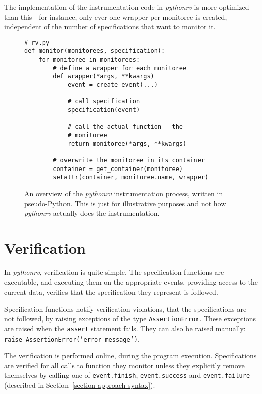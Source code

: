 \documentclass[a4paper,11pt]{kth-mag}
\begin{document}
The implementation of the instrumentation code in \textit{pythonrv} is more
optimized than this - for instance, only ever one wrapper per monitoree is
created, independent of the number of specifications that want to monitor it.

\begin{figure}[h!]
	\begin{center}
	\begin{minipage}{0.7\textwidth}
	\begin{lstlisting}
# rv.py
def monitor(monitorees, specification):
	for monitoree in monitorees:
		# define a wrapper for each monitoree
		def wrapper(*args, **kwargs)
			event = create_event(...)

			# call specification
			specification(event)

			# call the actual function - the
			# monitoree
			return monitoree(*args, **kwargs)

		# overwrite the monitoree in its container
		container = get_container(monitoree)
		setattr(container, monitoree.name, wrapper)
	\end{lstlisting}
	\end{minipage}
	\end{center}

	\caption{An overview of the \textit{pythonrv} instrumentation process,
		written in pseudo-Python. This is just for illustrative purposes and not
		how \textit{pythonrv} actually does the instrumentation.}
	\label{figure-instrumentation-overview}
\end{figure}



\section{Verification} \label{section-approach-verification}

In \textit{pythonrv}, verification is quite simple. The specification functions
are executable, and executing them on the appropriate events, providing access
to the current data, verifies that the specification they represent is
followed.

Specification functions notify verification violations, that the specifications
are not followed, by raising exceptions of the type \texttt{AssertionError}.
These exceptions are raised when the \texttt{assert} statement fails. They can
also be raised manually: \texttt{raise AssertionError('error message')}.

The verification is performed online, during the program execution.
Specifications are verified for all calls to function they monitor unless they
explicitly remove themselves by calling one of \texttt{event.finish},
\texttt{event.success} and \texttt{event.failure} (described in
Section~\ref{section-approach-syntax}).
\end{document}
